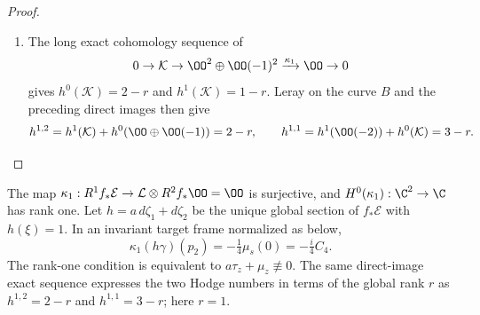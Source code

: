 \begin{proof}
\begin{enumerate}[label=\arabic*.,leftmargin=*]
\item The long exact cohomology sequence of
\[
0\to\mathcal K\to\OO^2\oplus\OO(-1)^2
 \xrightarrow{\kappa_1}\OO\to0
\]
gives $h^0(\mathcal K)=2-r$ and $h^1(\mathcal K)=1-r$.
Leray on the curve $B$ and the preceding direct images then give
\[
h^{1,2}=h^1(\mathcal K)+h^0(\OO\oplus\OO(-1))=2-r,
\qquad
h^{1,1}=h^1(\OO(-2))+h^0(\mathcal K)=3-r.
\]
\end{enumerate}
\end{proof}

\begin{proposition}\hypertarget{tag-01RX}{}\label{inv:A2.4}\label{wb:thm:h12-scalar}

The map
$\kappa_1:R^1f_*\mathcal E\to\mathcal L\otimes R^2f_*\OO=\OO$
is surjective, and $H^0(\kappa_1):\C^2\to\C$ has rank one.
Let $h=a\,d\zeta_1+d\zeta_2$ be the unique global section of
$f_*\mathcal E$ with $h(\xi)=1$.  In an invariant target
frame normalized as below,
\[
\kappa_1(h\gamma)(p_2)=-\tfrac14\mu_s(0)=-\tfrac i4 C_4.
\]
The rank-one condition is equivalent to
$a\tau_z+\mu_z\not\equiv0$.  The same direct-image exact sequence expresses the two Hodge numbers
in terms of the global rank $r$ as
$h^{1,2}=2-r$ and $h^{1,1}=3-r$; here $r=1$.
\end{proposition}


